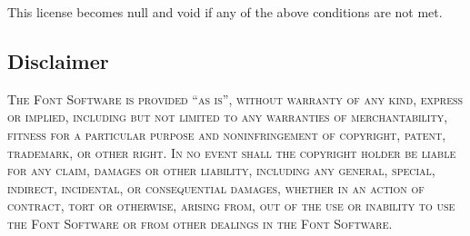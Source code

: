This license becomes null and void if any of the above
conditions are not met.

\subsection*{Disclaimer}
\label{sil:disclaimer}

\textsc{The Font Software is provided ``as is'', without
warranty of any kind, express or implied, including but not
limited to any warranties of merchantability, fitness for a
particular purpose and noninfringement of copyright, patent,
trademark, or other right. In no event shall the copyright
holder be liable for any claim, damages or other liability,
including any general, special, indirect, incidental, or
consequential damages, whether in an action of contract,
tort or otherwise, arising from, out of the use or inability
to use the Font Software or from other dealings in the Font
Software.}
